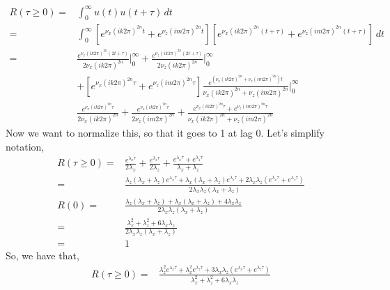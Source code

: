\documentclass[11pt, oneside]{article}   	%
\begin{document}
\begin{align}
R(\tau \geq 0) =& \int_0^\infty u(t)u(t+\tau) \, dt \\
=& \int_0^\infty \left[ e^{\nu_x (i k 2 \pi)^{2n} t} + e^{\nu_z (i m 2 \pi)^{2n} t} \right] \left[ e^{\nu_x (i k 2 \pi)^{2n} (t+\tau)} + e^{\nu_z (i m 2 \pi)^{2n} (t+\tau)} \right] \, dt \\
=& \frac{e^{ \nu_x (i k 2 \pi)^{2n} (2t + \tau)}}{2 \nu_x (i k 2 \pi)^{2n}} \biggr\rvert_0^\infty + \frac{e^{ \nu_z (i k 2 \pi)^{2n} (2t + \tau)}}{2 \nu_z (i k 2 \pi)^{2n}} \biggr\rvert_0^\infty \\
& + \left[ e^{\nu_x (i k 2 \pi)^{2n} \tau} + e^{\nu_z (i m 2 \pi)^{2n} \tau} \right] \frac{e^{ (\nu_x (i k 2 \pi)^{2n} + \nu_z (i m 2 \pi)^{2n}) t}}{\nu_x (i k 2 \pi)^{2n} + \nu_z (i m 2 \pi)^{2n}}\biggr\rvert_0^\infty \\
&\frac{e^{ \nu_x (i k 2 \pi)^{2n} \tau}}{2 \nu_x (i k 2 \pi)^{2n}}+ \frac{e^{ \nu_z (i k 2 \pi)^{2n} \tau}}{2 \nu_z (i m 2 \pi)^{2n}} + \frac{e^{\nu_x (i k 2 \pi)^{2n} \tau} + e^{\nu_z (i m 2 \pi)^{2n} \tau}}{ \nu_x (i k 2 \pi)^{2n} + \nu_z (i m 2 \pi)^{2n} }
\end{align}
Now we want to normalize this, so that it goes to 1 at lag 0. Let's simplify notation,
\begin{align}
R(\tau \geq 0) =& \frac{ e^{\lambda_x \tau} }{2 \lambda_x} +  \frac{ e^{\lambda_z \tau} }{2 \lambda_z}  +  \frac{ e^{\lambda_x \tau} + e^{\lambda_z \tau} }{ \lambda_x +  \lambda_z} \\
=& \frac{\lambda_z (\lambda_x + \lambda_z) e^{\lambda_x \tau} + \lambda_x (\lambda_x + \lambda_z) e^{\lambda_z \tau} + 2 \lambda_x \lambda_z \left( e^{\lambda_x \tau} + e^{\lambda_z \tau}\right) }{2 \lambda_x \lambda_z (\lambda_x + \lambda_z)}\\
R(0) =&  \frac{ \lambda_z (\lambda_x + \lambda_z) + \lambda_x (\lambda_x + \lambda_z) + 4 \lambda_x \lambda_z}{2 \lambda_x \lambda_z (\lambda_x + \lambda_z)} \\
=& \frac{\lambda_x^2 + \lambda_z^2 + 6 \lambda_x \lambda_z}{2 \lambda_x \lambda_z (\lambda_x + \lambda_z)} \\
=& 1
\end{align}
So, we have that,
\begin{align}
R(\tau \geq 0) =&\frac{\lambda_z^2 e^{\lambda_x \tau} + \lambda_x^2 e^{\lambda_z \tau} + 3 \lambda_x \lambda_z \left( e^{\lambda_x \tau} + e^{\lambda_z \tau}\right) }{\lambda_x^2 + \lambda_z^2 + 6 \lambda_x \lambda_z}
\end{align}
\end{document}
